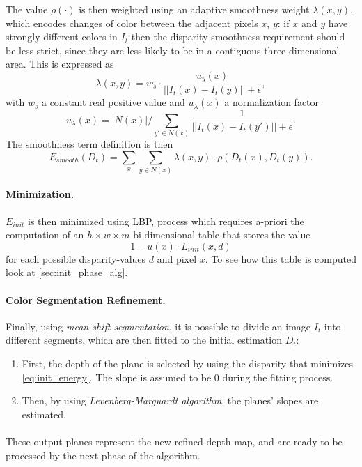 \documentclass[notitlepage,english]{hgbreport}
\newcommand{\Acronym}[1]{{#1}}
\newcommand{\LBP}{\Acronym{LBP}}
\begin{document}
The value $\rho(\cdot)$ is then weighted using an adaptive smoothness weight $\lambda(x,y)$, which encodes changes of color between the adjacent pixels $x$, $y$: if $x$ and $y$ have strongly different colors in $I_t$ then the disparity smoothness requirement should be less strict, since they are less likely to be in a contiguous three-dimensional area. This is expressed as 
$$\lambda(x,y) = w_s\cdot \frac{u_y(x)}{|| I_t(x) - I_t(y)|| + \epsilon},$$
with $w_s$ a constant real positive value and $u_{\lambda}(x)$ a normalization factor
$$
	u_{\lambda}(x) = {|N(x)|}\big/{\sum_{y'\in N(x)} \frac{1}{||I_t(x) - I_t(y')||+\epsilon}}.
$$
The smoothness term definition is then
\begin{equation}
	E_{smooth}(D_t) = \sum_x \sum_{y\in N(x)} \lambda(x,y)\cdot \rho(D_t(x),D_t(y)).
\end{equation}

\paragraph{Minimization.}
$E_{init}$ is then minimized using \LBP{}, process which requires a-priori the computation of an $h\times w\times m$ bi-dimensional table that stores the value
$$1-u(x)\cdot L_{init}(x,d)$$ for each possible disparity-values $d$ and pixel $x$. To see how this table is computed look at \cref{sec:init_phase_alg}.




\paragraph{Color Segmentation Refinement.}
Finally, using \emph{mean-shift segmentation}, it is possible to divide an image $I_t$ into different segments, which are then fitted to the initial estimation $D_t$:
\begin{enumerate}
\item First, the depth of the plane is selected by using the disparity that minimizes \cref{eq:init_energy}. The slope is assumed to be 0 during the fitting process.
\item Then, by using \emph{Levenberg-Marquardt algorithm}, the planes' slopes are estimated.
\end{enumerate}
\paragraph{}
These output planes represent the new refined depth-map, and are ready to be processed by the next phase of the algorithm.%
\end{document}
